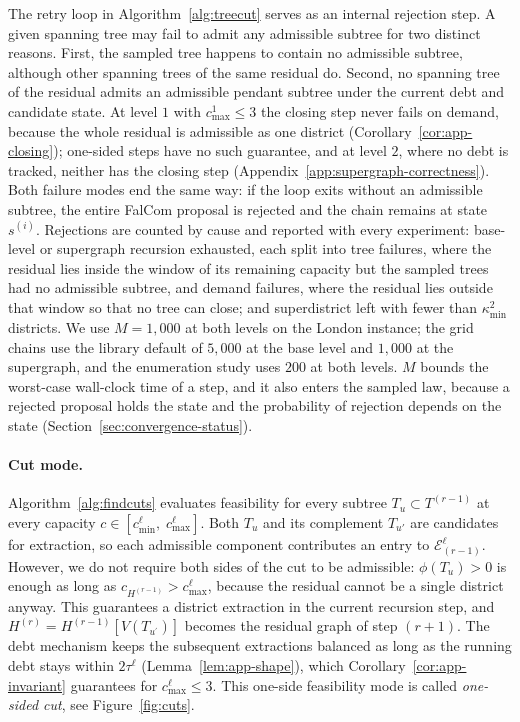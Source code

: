\documentclass[preprint,12pt,authoryear]{elsarticle}
\theoremstyle{definition}
\begin{document}
\medskip
\medskip

The retry loop in Algorithm~\ref{alg:treecut} serves as an internal rejection step. A given spanning tree may fail to admit any admissible subtree for two distinct reasons. First, the sampled tree happens to contain no admissible subtree, although other spanning trees of the same residual do. Second, no spanning tree of the residual admits an admissible pendant subtree under the current debt and candidate state. At level $1$ with $c^{1}_{\max} \leq 3$ the closing step never fails on demand, because the whole residual is admissible as one district (Corollary~\ref{cor:app-closing}); one-sided steps have no such guarantee, and at level $2$, where no debt is tracked, neither has the closing step (Appendix~\ref{app:supergraph-correctness}). Both failure modes end the same way: if the loop exits without an admissible subtree, the entire FalCom proposal is rejected and the chain remains at state $s^{(i)}$. Rejections are counted by cause and reported with every experiment: base-level or supergraph recursion exhausted, each split into tree failures, where the residual lies inside the window of its remaining capacity but the sampled trees had no admissible subtree, and demand failures, where the residual lies outside that window so that no tree can close; and superdistrict left with fewer than $\kappa^2_{\min}$ districts. We use $M = 1{,}000$ at both levels on the London instance; the grid chains use the library default of $5{,}000$ at the base level and $1{,}000$ at the supergraph, and the enumeration study uses $200$ at both levels. $M$ bounds the worst-case wall-clock time of a step, and it also enters the sampled law, because a rejected proposal holds the state and the probability of rejection depends on the state (Section~\ref{sec:convergence-status}).

\paragraph{Cut mode.} Algorithm~\ref{alg:findcuts} evaluates feasibility for every subtree $T_u \subset T^{(r-1)}$ at every capacity $c \in [c^{\ell}_{\min}, \; c^{\ell}_{\max}]$. Both $T_u$ and its complement $T_{u'}$ are candidates for extraction, so each admissible component contributes an entry to $\mathcal{E}^\ell_{(r-1)}$. However, we do not require both sides of the cut to be admissible: $\phi(T_u) > 0$ is enough as long as $c_{H^{(r-1)}} > c^{\ell}_{\max}$, because the residual cannot be a single district anyway. This guarantees a district extraction in the current recursion step, and $H^{(r)} = H^{(r-1)}[V(T_{u^{\prime}})]$ becomes the residual graph of step $(r+1)$. The debt mechanism keeps the subsequent extractions balanced as long as the running debt stays within $2\tau^{\ell}$ (Lemma~\ref{lem:app-shape}), which Corollary~\ref{cor:app-invariant} guarantees for $c^{\ell}_{\max} \leq 3$. This one-side feasibility mode is called \emph{one-sided cut}, see Figure~\hyperref[fig:4a]{\ref*{fig:cuts}}.
\end{document}
